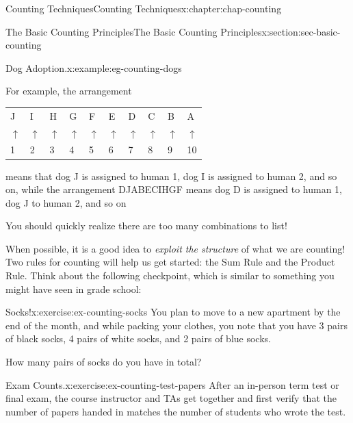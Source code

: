 \documentclass[oneside,10pt,]{book}
\newcommand{\tabularfont}{\relax}
\numberwithin{equation}{section}
\begin{document}
\begin{chapterptx}{Counting Techniques}{}{Counting Techniques}{}{}{x:chapter:chap-counting}
\begin{sectionptx}{The Basic Counting Principles}{}{The Basic Counting Principles}{}{}{x:section:sec-basic-counting}
\begin{example}{Dog Adoption.}{x:example:eg-counting-dogs}
\par
For example, the arrangement%
\begin{sidebyside}{1}{0.1}{0.1}{0}%
\begin{sbspanel}{0.8}%
{\centering%
{\tabularfont%
\begin{tabular}{llllllllll}
J&I&H&G&F&E&D&C&B&A\tabularnewline[0pt]
\(\uparrow\)&\(\uparrow\)&\(\uparrow\)&\(\uparrow\)&\(\uparrow\)&\(\uparrow\)&\(\uparrow\)&\(\uparrow\)&\(\uparrow\)&\(\uparrow\)\tabularnewline[0pt]
1&2&3&4&5&6&7&8&9&10
\end{tabular}
}%
\par}
\end{sbspanel}%
\end{sidebyside}%
\par
means that dog J is assigned to human 1, dog I is assigned to human 2, and so on, while the arrangement DJABECIHGF means dog D is assigned to human 1, dog J to human 2, and so on\textellipsis{}%
\par
You should quickly realize there are too many combinations to list!%
\end{example}
When possible, it is a good idea to \emph{exploit the structure} of what we are counting! Two rules for counting will help us get started: the Sum Rule and the Product Rule. Think about the following checkpoint, which is similar to something you might have seen in grade school:%
\begin{inlineexercise}{Socks!}{x:exercise:ex-counting-socks}%
You plan to move to a new apartment by the end of the month, and while packing your clothes, you note that you have 3 pairs of black socks, 4 pairs of white socks, and 2 pairs of blue socks.%
\par
How many pairs of socks do you have in total?%
\end{inlineexercise}
\begin{inlineexercise}{Exam Counts.}{x:exercise:ex-counting-test-papers}%
After an in-person term test or final exam, the course instructor and TAs get together and first verify that the number of papers handed in matches the number of students who wrote the test.%
\begin{sidebyside}{1}{0.25}{0.25}{0}%
\begin{sbspanel}{0.5}%

\end{sbspanel}
\end{sidebyside}
\end{inlineexercise}
\end{sectionptx}
\end{chapterptx}
\end{document}

